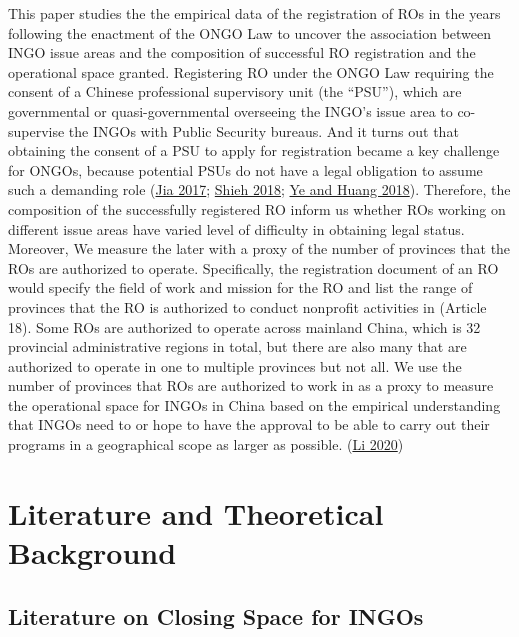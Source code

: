 \documentclass[
]{article}
\begin{document}
This paper studies the the empirical data of the registration of ROs in
the years following the enactment of the ONGO Law to uncover the
association between INGO issue areas and the composition of successful
RO registration and the operational space granted. Registering RO under
the ONGO Law requiring the consent of a Chinese professional supervisory
unit (the ``PSU''), which are governmental or quasi-governmental
overseeing the INGO's issue area to co-supervise the INGOs with Public
Security bureaus. And it turns out that obtaining the consent of a PSU
to apply for registration became a key challenge for ONGOs, because
potential PSUs do not have a legal obligation to assume such a demanding
role (\protect\hyperlink{ref-Jia:2017}{Jia 2017};
\protect\hyperlink{ref-Shieh:2018}{Shieh 2018};
\protect\hyperlink{ref-YeHuang:2018}{Ye and Huang 2018}). Therefore, the
composition of the successfully registered RO inform us whether ROs
working on different issue areas have varied level of difficulty in
obtaining legal status. Moreover, We measure the later with a proxy of
the number of provinces that the ROs are authorized to operate.
Specifically, the registration document of an RO would specify the field
of work and mission for the RO and list the range of provinces that the
RO is authorized to conduct nonprofit activities in (Article 18). Some
ROs are authorized to operate across mainland China, which is 32
provincial administrative regions in total, but there are also many that
are authorized to operate in one to multiple provinces but not all. We
use the number of provinces that ROs are authorized to work in as a
proxy to measure the operational space for INGOs in China based on the
empirical understanding that INGOs need to or hope to have the approval
to be able to carry out their programs in a geographical scope as larger
as possible. (\protect\hyperlink{ref-Li:2020}{Li 2020})

\hypertarget{literature-and-theoretical-background}{%
\section{Literature and Theoretical
Background}\label{literature-and-theoretical-background}}

\hypertarget{literature-on-closing-space-for-ingos}{%
\subsection{Literature on Closing Space for
INGOs}\label{literature-on-closing-space-for-ingos}}
\end{document}
